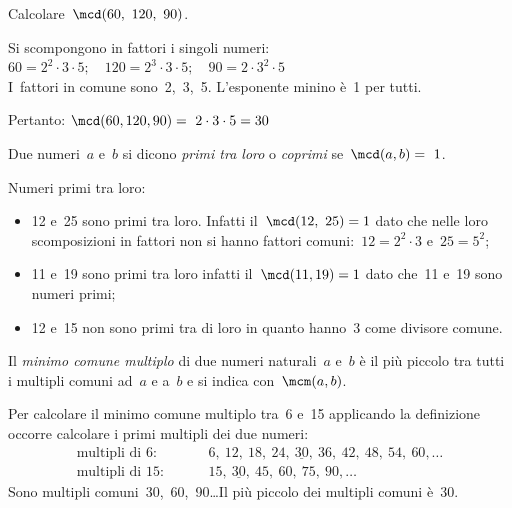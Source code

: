  \begin{esempio}{}{}
 Calcolare~\(\mcd(60,~120,~90)\).

Si scompongono in fattori i singoli numeri:\\
\(60 = 2^2\cdot3\cdot5; 
\quad 120 = 2^3\cdot3\cdot5; 
\quad 90 = 2\cdot3^2\cdot5\)\\
I~fattori in comune sono~2,~3,~5. L'esponente minino è~1 per tutti.

Pertanto: \quad \(\mcd(60,120,90)=~2\cdot3\cdot5=30\)
 \end{esempio}

\begin{definizione}{}{}
 Due numeri~\(a\) e~\(b\) si dicono \emph{primi tra loro} o \emph{coprimi} 
 se~\(\mcd(a,b) =~1\).
\end{definizione}

 \begin{esempio}{}{}
 Numeri primi tra loro:
 \begin{itemize} [noitemsep]
 \item 12 e~25 sono primi tra loro. Infatti il~\(\mcd(12,~25)=1\) dato che 
  nelle loro scomposizioni in fattori non si hanno fattori 
  comuni:~\(12 =2^2\cdot3\) e~\(25=5^2\);
 \item 11 e~19 sono primi tra loro infatti il~\(\mcd(11,19)=1\) dato che~11 
  e~19 sono numeri primi;
 \item 12 e~15 non sono primi tra di loro in quanto hanno~3 come divisore 
  comune.
 \end{itemize}
 \end{esempio}

\begin{definizione}{}{}
 Il \emph{minimo comune multiplo} di due numeri naturali~\(a\) e~\(b\) è il più
 piccolo tra tutti i multipli comuni ad~\(a\) e a~\(b\) 
 e si indica con~\(\mcm(a,b)\).
\end{definizione}

Per calcolare il minimo comune multiplo tra~6 e~15 applicando la 
definizione 
occorre calcolare i primi multipli dei due numeri:
\begin{align*}
\text{multipli di }6: & 
\qquad~6,~12,~18,~24,~\underline{30},~36,~42,~48,~54,~60,\ldots \\
\text{multipli di }15: & \qquad~15,~\underline{30},~45,~60,~75,~90,\ldots
\end{align*}
Sono multipli comuni~30,~60,~90\ldots Il più piccolo dei multipli comuni 
è~30.

